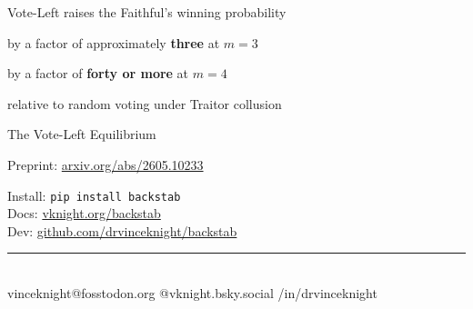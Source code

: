 \documentclass{beamer}
\begin{document}
\begin{frame}
    \begin{center}
        \large
        Vote-Left raises the Faithful's winning probability

        \vfill
        \LARGE
        by a factor of approximately
        \textbf{\textcolor{faithful}{three}} at \(m = 3\)

        \vfill
        by a factor of
        \textbf{\textcolor{faithful}{forty or more}} at \(m = 4\)

        \vfill
        \normalsize
        relative to random voting under Traitor collusion
    \end{center}
\end{frame}

\begin{frame}
    \begin{center}
        \Large
        The Vote-Left Equilibrium

        \vfill
        Preprint: \url{arxiv.org/abs/2605.10233}

        \vfill
        \large
        Install: \texttt{pip install backstab}\\
        Docs: \url{vknight.org/backstab}\\
        Dev: \url{github.com/drvinceknight/backstab}
    \end{center}
    \vfill
    {\footnotesize%
    \noindent\rule{\textwidth}{0.3pt}\\[4pt]%
    \hfill
    {\color{socialmastodon}vinceknight@fosstodon.org}\hfill
    {\color{socialbluesky}@vknight.bsky.social}\hfill
    {\color{sociallinkedin}/in/drvinceknight}%
    \hfill}
\end{frame}
\end{document}
